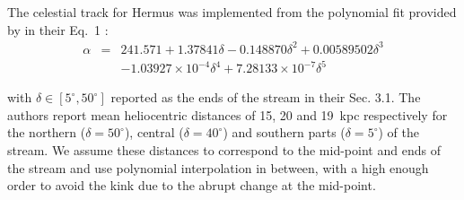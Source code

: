 The celestial track for Hermus was implemented from the polynomial fit provided by \citet{Grillmair2014} in their Eq.~1 :
\begin{eqnarray*}
\alpha &=& 241.571 + 1.37841\delta - 0.148870\delta^2 + 0.00589502\delta^3 \\
       & &- 1.03927\times 10^{-4}\delta^4 + 7.28133\times 10^{-7}\delta^5
\end{eqnarray*}

with $\delta \in [5^\circ, 50^\circ ]$ reported as the ends of the stream in their Sec. 3.1. The authors report mean heliocentric distances of 15, 20 and 19~kpc respectively for the northern ($\delta =50^\circ$), central ($\delta =40^\circ$) and southern parts ($\delta =5^\circ$) of the stream. We assume these distances to correspond to the mid-point and ends of the stream and use polynomial interpolation in between, with a high enough order to avoid the kink due to the abrupt change at the mid-point. 
